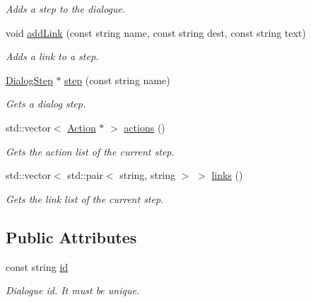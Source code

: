 \begin{DoxyCompactItemize}
\begin{DoxyCompactList}\small\item\em Adds a step to the dialogue. \item\end{DoxyCompactList}\item 
void \hyperlink{classDialog_a268aef7796ad9fee88986532967608af}{addLink} (const string name, const string dest, const string text)
\begin{DoxyCompactList}\small\item\em Adds a link to a step. \item\end{DoxyCompactList}\item 
\hypertarget{classDialog_aa37e4db7285bb2d73ffdb4eb3cb4adbc}{
\hyperlink{structDialogStep}{DialogStep} $\ast$ \hyperlink{classDialog_aa37e4db7285bb2d73ffdb4eb3cb4adbc}{step} (const string name)}
\label{classDialog_aa37e4db7285bb2d73ffdb4eb3cb4adbc}

\begin{DoxyCompactList}\small\item\em Gets a dialog step. \item\end{DoxyCompactList}\item 
\hypertarget{classDialog_a16e1cbbab2a69ebaf6867a27c2b21c9b}{
std::vector$<$ \hyperlink{classAction}{Action} $\ast$ $>$ \hyperlink{classDialog_a16e1cbbab2a69ebaf6867a27c2b21c9b}{actions} ()}
\label{classDialog_a16e1cbbab2a69ebaf6867a27c2b21c9b}

\begin{DoxyCompactList}\small\item\em Gets the action list of the current step. \item\end{DoxyCompactList}\item 
std::vector$<$ std::pair$<$ string, string $>$ $>$ \hyperlink{classDialog_a3cc460493c81848ab77b536efa507b9f}{links} ()
\begin{DoxyCompactList}\small\item\em Gets the link list of the current step. \item\end{DoxyCompactList}\end{DoxyCompactItemize}
\subsection*{Public Attributes}
\begin{DoxyCompactItemize}
\item 
\hypertarget{classDialog_a9208037888887f201505a93e77cd9d40}{
const string \hyperlink{classDialog_a9208037888887f201505a93e77cd9d40}{id}}
\label{classDialog_a9208037888887f201505a93e77cd9d40}

\begin{DoxyCompactList}\small\item\em Dialogue id. It must be unique. \item\end{DoxyCompactList}\end{DoxyCompactItemize}


